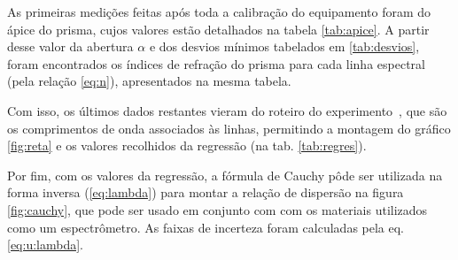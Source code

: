 

As primeiras medições feitas após toda a calibração do equipamento foram do ápice do prisma, cujos valores estão detalhados na tabela \ref{tab:apice}. A partir desse valor da abertura $\alpha$ e dos desvios mínimos tabelados em \ref{tab:desvios}, foram encontrados os índices de refração do prisma para cada linha espectral (pela relação \ref{eq:n}), apresentados na mesma tabela.



Com isso, os últimos dados restantes vieram do roteiro do experimento~\cite{ref:roteiro}, que são os comprimentos de onda associados às linhas, permitindo a montagem do gráfico \ref{fig:reta} e os valores recolhidos da regressão (na tab. \ref{tab:regres}).





Por fim, com os valores da regressão, a fórmula de Cauchy pôde ser utilizada na forma inversa (\ref{eq:lambda}) para montar a relação de dispersão na figura \ref{fig:cauchy}, que pode ser usado em conjunto com com os materiais utilizados como um espectrômetro. As faixas de incerteza foram calculadas pela eq. \ref{eq:u:lambda}.


